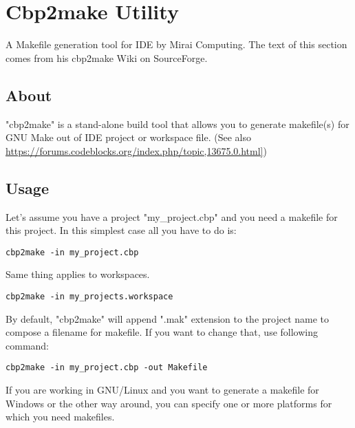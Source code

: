 \section{Cbp2make Utility}\label{sec:cbp2make}

A Makefile generation tool for \codeblocks IDE by Mirai Computing. The text of this section comes from his cbp2make Wiki on SourceForge.

\subsection{About}

"cbp2make" is a stand-alone build tool that allows you to generate makefile(s) for GNU Make out of \codeblocks IDE project or workspace file. (See also \url{https://forums.codeblocks.org/index.php/topic,13675.0.html]})

\subsection{Usage}

Let's assume you have a project "my\_project.cbp" and you need a makefile for this project. In this simplest case all you have to do is:
\begin{lstlisting}
cbp2make -in my_project.cbp
\end{lstlisting}

Same thing applies to workspaces.
\begin{lstlisting}
cbp2make -in my_projects.workspace
\end{lstlisting}

By default, "cbp2make" will append ".mak" extension to the project name to compose a filename for makefile.
If you want to change that, use following command:

\begin{lstlisting}
cbp2make -in my_project.cbp -out Makefile
\end{lstlisting}

If you are working in GNU/Linux and you want to generate a makefile for Windows or the other way around, you can specify one or more platforms for which you need makefiles.

